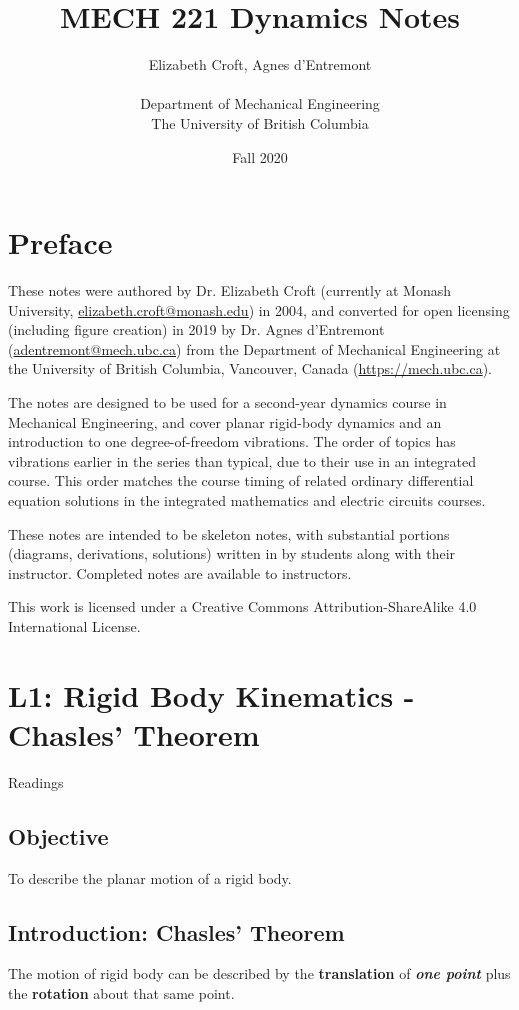 \documentclass[12pt,letterpaper,twoside]{report}
\author{Elizabeth Croft, Agnes d'Entremont \\  \\ Department of Mechanical Engineering \\ The University of British Columbia}
\begin{document}
\title{MECH 221 Dynamics Notes}
\date{Fall 2020}
\maketitle

\chapter*{Preface}
These notes were authored by Dr. Elizabeth Croft (currently at Monash University, \url{elizabeth.croft@monash.edu}) in 2004, and converted for open licensing (including figure creation) in 2019 by Dr. Agnes d'Entremont (\url{adentremont@mech.ubc.ca}) from the Department of Mechanical Engineering at the University of British Columbia, Vancouver, Canada (\url{https://mech.ubc.ca}).  

The notes are designed to be used for a second-year dynamics course in Mechanical Engineering, and cover planar rigid-body dynamics and an introduction to one degree-of-freedom vibrations. The order of topics has vibrations earlier in the series than typical, due to their use in an integrated course. This order matches the course timing of related ordinary differential equation solutions in the integrated mathematics and electric circuits courses. 

These notes are intended to be skeleton notes, with substantial portions (diagrams, derivations, solutions) written in by students along with their instructor.  Completed notes are available to instructors.  

This work is licensed under a Creative Commons Attribution-ShareAlike 4.0 International License. 

\newpage
\tableofcontents

\chapter{L1: Rigid Body Kinematics - Chasles' Theorem}
Readings

\section{Objective}
To describe the planar motion of a rigid body.

\section{Introduction: Chasles’ Theorem}
The motion of rigid body can be described by the \textbf{translation} of \textbf{\textit{one point}} plus the \textbf{rotation} about that same point.
\end{document}
